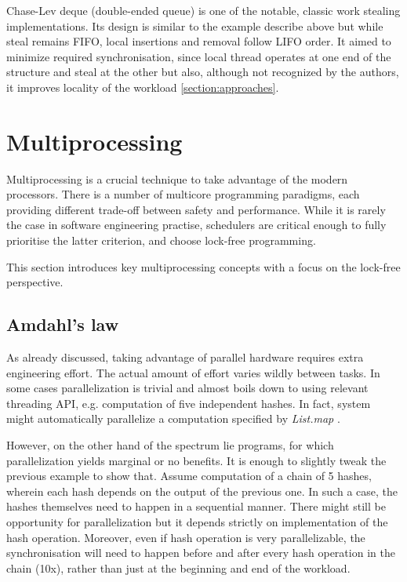 \documentclass[12pt,a4paper,twoside]{report}
\begin{document}
\label{paragraph:deque}
Chase-Lev deque (double-ended queue) \cite{Chase2005} is one of the notable, classic work stealing implementations. Its design is similar to the example describe above but while steal remains FIFO, local insertions and removal follow LIFO order. It aimed to minimize required synchronisation, since local thread operates at one end of the structure and steal at the other but also, although not recognized by the authors, it improves locality of the workload \ref{section:approaches}. 

\section{Multiprocessing}
\label{section:background_multiprocessing}

Multiprocessing is a crucial technique to take advantage of the modern processors. There is a number of multicore programming paradigms, each providing different trade-off between safety and performance. While it is rarely the case in software engineering practise, schedulers are critical enough to fully prioritise the latter criterion, and choose lock-free programming. 

This section introduces key multiprocessing concepts with a focus on the lock-free perspective. 

\subsection{Amdahl's law}
As already discussed, taking advantage of parallel hardware requires extra engineering effort. The actual amount of effort varies wildly between tasks. In some cases parallelization is trivial and almost boils down to using relevant threading API, e.g. computation of five independent hashes. In fact, system might automatically parallelize a computation specified by \textit{List.map} \cite{OCamllib90:online}. 

However, on the other hand of the spectrum lie programs, for which parallelization yields marginal or no benefits. It is enough to slightly tweak the previous example to show that. Assume computation of a chain of 5 hashes, wherein each hash depends on the output of the previous one. In such a case, the hashes themselves need to happen in a sequential manner. There might still be opportunity for parallelization but it depends strictly on implementation of the hash operation. Moreover, even if hash operation is very parallelizable, the synchronisation will need to happen before and after every hash operation in the chain (10x), rather than just at the beginning and end of the workload. 
\end{document}
